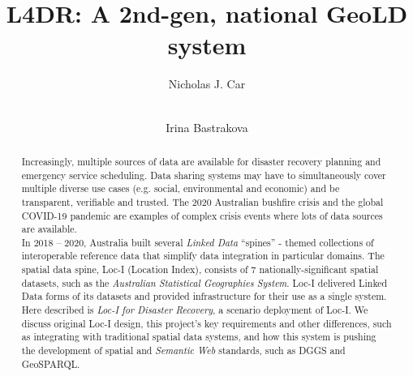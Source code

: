 \documentclass[runningheads]{llncs}
\begin{document}
\title{L4DR: A 2nd-gen, national GeoLD system}

\author{
    Nicholas J. Car \and \\
    Irina Bastrakova
}



\maketitle

\begin{abstract}
Increasingly, multiple sources of data are available for disaster recovery planning and emergency service scheduling. Data sharing systems may
have to simultaneously cover multiple diverse use cases (e.g. social, environmental and economic) and be transparent, verifiable and trusted. 
The 2020 Australian bushfire crisis and the global COVID-19 pandemic are examples of complex crisis events where lots of data sources are available.\\

In 2018 – 2020, Australia built several \textit{Linked Data} ``spines'' - themed collections of interoperable reference data that simplify data 
integration in particular domains. 
The spatial data spine, Loc-I (Location Index), consists of 7 nationally-significant spatial datasets, such as the \textit{Australian Statistical Geographies System}. 
Loc-I delivered Linked Data forms of its datasets and provided infrastructure for their use as a single system.\\

Here described is \textit{Loc-I for Disaster Recovery}, a scenario deployment of Loc-I.
We discuss original Loc-I design, this project's key requirements and other differences, such as integrating with traditional
spatial data systems, and how this system is pushing the development of spatial and \textit{Semantic Web} standards, such as DGGS and GeoSPARQL.

\end{abstract}
\end{document}
